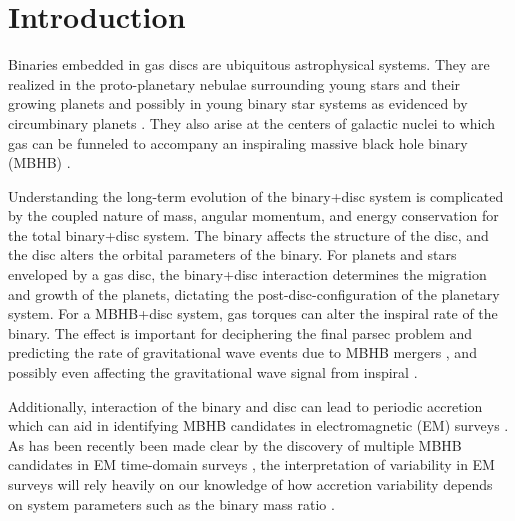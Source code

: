 \section{Introduction}
Binaries embedded in gas discs are ubiquitous astrophysical systems. They are realized in the proto-planetary nebulae surrounding young stars and their growing planets \citep{KleyNelson:2012:rev} and possibly in young binary star systems as evidenced by circumbinary planets \citep[\textit{e.g.}][]{ Orosz:2012Sci}. They also arise at the centers of galactic nuclei to which gas can be funneled to accompany an inspiraling massive black hole binary (MBHB) \citep[][and see recent reviews by \cite{Dotti:2012:rev,Mayer:2013:MBHBGasRev}]{Barnes:1996}. 


Understanding the long-term evolution of the binary+disc system is
complicated by the coupled nature of mass, angular momentum, and energy
conservation for the total binary+disc system. The binary affects the
structure of the disc, and the disc alters the orbital parameters of
the binary. For planets and stars enveloped by a gas disc, the
binary+disc interaction determines the migration and growth of the
planets, dictating the post-disc-configuration of the planetary
system. For a MBHB+disc system, gas torques can alter the inspiral
rate of the binary. The effect is important for deciphering the final
parsec problem and predicting the rate of gravitational wave events
due to MBHB mergers \citep{Begel:Blan:Rees:1980, GouldRix:2000,
  ArmNat:2002:ApJL, ArmNat:2005}, and possibly even affecting the
gravitational wave signal from inspiral \citep[D'Orazio et al., {\em in preparation};][]{YKH:2011:L, KocsisYunesLoeb:2011}.

Additionally, interaction of the binary and disc can lead to periodic accretion \citep{Hayasaki:2007, MacFadyen:2008, Cuadra:2009, Roedig:2011:eccevo, Noble+2012,ShiKrolik:2012:ApJ, Roedig:2012:Trqs, DHM:2013:MNRAS, Farris:2014, Dunhill:2015, ShiKrolik:2015} which can aid in identifying MBHB candidates in electromagnetic (EM) surveys \citep{HKM09}. As has been recently been made clear by the discovery of multiple MBHB candidates in EM time-domain surveys \citep{Graham+2015a, Graham+2015b, Liu:7RsMBHB:2015}, the interpretation of variability in EM surveys will rely heavily on our knowledge of how accretion variability depends on system parameters such as the binary mass ratio \citep[see \textit{e.g.}][]{PG1302MNRAS:2015a,PG1302Nature:2015b}.                                                                                                                                                                                                                                                                                                                                                                                                                                                                                                                                                                                                                                 


